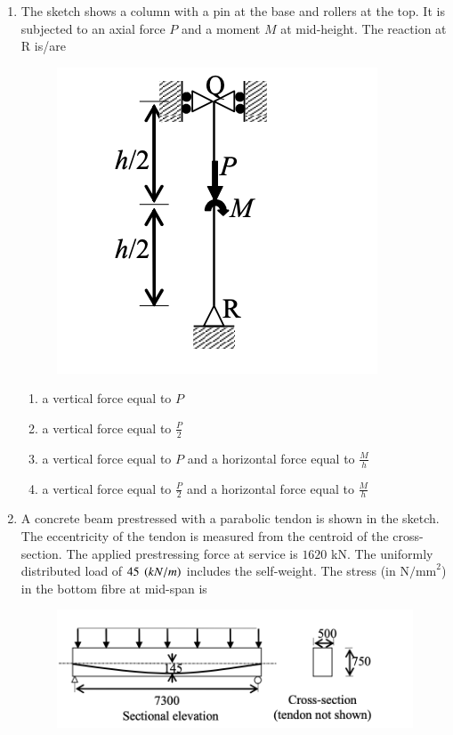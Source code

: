 \documentclass[journal]{IEEEtran}
\begin{document}
\begin{enumerate}
\item The sketch shows a column with a pin at the base and rollers at the top. It is subjected to an axial force $P$ and a moment $M$ at mid-height. The reaction at R is/are \hfill {}

\begin{figure}[H]
    \centering
    \includegraphics[width=0.3\columnwidth]{figs/Q32.png} 
    \caption{}
    \label{fig:placeholder}
\end{figure}

\begin{enumerate}

\item a vertical force equal to $P$
\item a vertical force equal to $\frac{P}{2}$
\item a vertical force equal to $P$ and a horizontal force equal to $\frac{M}{h}$
\item a vertical force equal to $\frac{P}{2}$ and a horizontal force equal to $\frac{M}{h}$

\end{enumerate}

\item A concrete beam prestressed with a parabolic tendon is shown in the sketch. The eccentricity of the tendon is measured from the centroid of the cross-section. The applied prestressing force at service is $1620$ kN. The uniformly distributed load of $45\ \brak{kN/m}$ includes the self-weight. The stress (in $\text{N/mm}^2$) in the bottom fibre at mid-span is \hfill {}
\begin{figure}[H]
    \centering
    \includegraphics[width=0.3\columnwidth]{figs/Q33.png} 
    \caption{}
    \label{fig:placeholder}
\end{figure}

\begin{enumerate}
\end{enumerate}


\end{enumerate}
\end{document}
